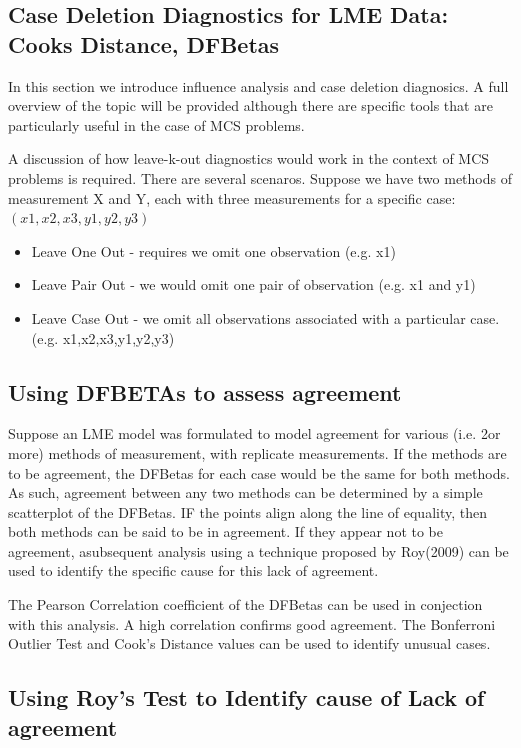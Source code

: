 \documentclass[Main.tex]{subfiles}
\begin{document}
\subsection*{Case Deletion Diagnostics for LME Data: Cooks Distance, DFBetas}
In this section we introduce influence analysis and case deletion diagnosics. A full overview of the topic will be provided although there are specific tools that are particularly useful in the case of MCS problems.

A discussion of how leave-k-out diagnostics would work in the context of MCS problems is required. There are several scenaros. Suppose we have two methods of measurement X and Y, each with three measurements for a specific case: $(x1,x2,x3,y1,y2,y3)$

\begin{itemize}
\item Leave One Out - requires we omit one observation (e.g. x1)
\item Leave Pair Out - we would omit one pair of observation (e.g. x1 and y1)
\item Leave Case Out - we omit all observations associated with a particular case. (e.g. x1,x2,x3,y1,y2,y3)
\end{itemize}
\subsection*{Using DFBETAs to assess agreement}
Suppose an LME model was formulated to model agreement for various (i.e. 2or more) methods of measurement, with replicate measurements. If the methods are to be agreement, the DFBetas for each case would be the same for both methods.
As such, agreement between any two methods can be determined by a simple scatterplot of the DFBetas. 
IF the points align along the line of equality, then both methods can be said to be in agreement. 
If they appear not to be agreement, asubsequent analysis using a technique proposed by Roy(2009) can be used to identify the specific cause for this lack of agreement.

The Pearson Correlation coefficient of the DFBetas can be used in conjection with this analysis. A high correlation confirms good agreement. The Bonferroni Outlier Test and Cook's Distance values can be used to identify unusual cases.
 
\subsection*{Using Roy's Test to Identify cause of Lack of agreement}
\end{document}
